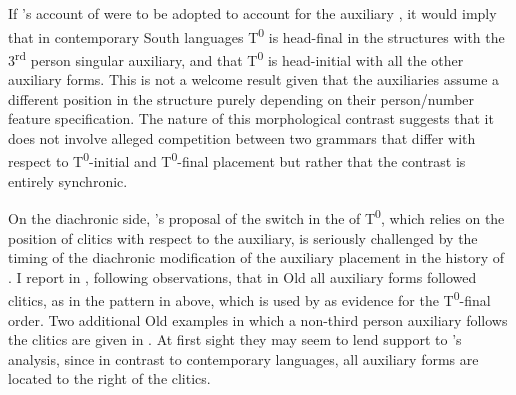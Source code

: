 \documentclass[output=paper,modfonts,newtxmath,hidelinks]{langscibook}
\begin{document}
\ea \label{11:ex11}
	\label{11:ex11a}
	\label{11:ex11b}
	\z
\z
If \citeauthor{pancheva2005}’s account of  were to be adopted to account for the auxiliary , it would imply that in contemporary South  languages T\textsuperscript{0} is head-final in the structures with the 3\textsuperscript{rd} person singular auxiliary, and that T\textsuperscript{0} is head-initial with all the other auxiliary forms. This is not a welcome result given that the auxiliaries assume a different position in the structure purely depending on their person/number feature specification. The nature of this morphological contrast suggests that it does not involve alleged competition between two grammars that differ with respect to T\textsuperscript{0}{}-initial and T\textsuperscript{0}{}-final placement but rather that the contrast is entirely synchronic.

\largerpage
On the diachronic side, \citeauthor{pancheva2005}’s proposal of the switch in the  of T\textsuperscript{0}, which relies on the position of  clitics with respect to the auxiliary, is seriously challenged by the timing of the diachronic modification of the auxiliary placement in the history of . I report in \citet[283--284]{migdalski2016}, following  observations, that in Old  all auxiliary forms followed  clitics, as in the pattern in  above, which is used by \citeauthor{pancheva2005} as evidence for the T\textsuperscript{0}{}-final order. Two additional Old  examples in which a non-third person auxiliary follows the  clitics are given in . At first sight they may seem to lend support to \citeauthor{pancheva2005}'s analysis, since in contrast to contemporary  languages, all auxiliary forms are located to the right of the  clitics.
\end{document}
